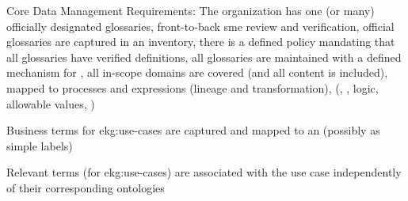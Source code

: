 \kgmmscoringsection

Core Data Management Requirements: The organization has one (or many) officially designated glossaries,
front-to-back \gls{sme} review and verification, official glossaries are captured in an inventory,
there is a defined policy mandating that all glossaries have verified definitions,
all glossaries are maintained with a defined mechanism for ,
all in-scope domains are covered (and all content is included), mapped to processes and expressions
(lineage and transformation),  (, , logic,
allowable values, )

\kgmmscoringlevelOne

\begin{scoring}

  \item Business terms for \glspl{ekg:use-case} are captured and mapped to an 
        (possibly as simple labels)


\end{scoring}

\kgmmscoringlevelTwo

\begin{scoring}

  \item Relevant terms (for \glspl{ekg:use-case}) are associated with the use case independently of
  their corresponding ontologies


\end{scoring}


